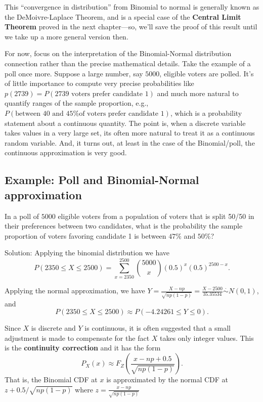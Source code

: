 \documentclass[
]{book}
\begin{document}
This ``convergence in distribution'' from Binomial to normal is generally known as the DeMoivre-Laplace Theorem, and is a special case of the \textbf{Central Limit Theorem} proved in the next chapter---so, we'll save the proof of this result until we take up a more general version then.

For now, focus on the interpretation of the Binomial-Normal distribution connection rather than the precise mathematical details. Take the example of a poll once more. Suppose a large number, say \(5000\), eligible voters are polled. It's of little importance to compute very precise probabilities like \(p(2739) = P(\text{2739 voters prefer candidate 1})\) and much more natural to quantify ranges of the sample proportion, e.g., \(P(\text{between 40 and 45\% of voters prefer candidate 1})\), which is a probability statement about a continuous quantity. The point is, when a discrete variable takes values in a very large set, its often more natural to treat it as a continuous random variable. And, it turns out, at least in the case of the Binomial/poll, the continuous approximation is very good.

\hypertarget{example-poll-and-binomial-normal-approximation}{%
\subsection{Example: Poll and Binomial-Normal approximation}\label{example-poll-and-binomial-normal-approximation}}

In a poll of \(5000\) eligible voters from a population of voters that is split 50/50 in their preferences between two candidates, what is the probability the sample proportion of voters favoring candidate 1 is between \(47\%\) and \(50\%\)?

Solution:
Applying the binomial distribution we have
\[P(2350\leq X \leq 2500) = \sum_{x=2350}^{2500} {5000 \choose x}(0.5)^x(0.5)^{2500-x}.\]

Applying the normal approximation, we have \(Y=\frac{X - np}{\sqrt{np(1-p)}} = \frac{X - 2500}{35.35534} \stackrel{\cdot}{\sim}N(0,1)\), and
\[P(2350\leq X \leq 2500)\approx P(-4.24261 \leq Y \leq 0).\]

Since \(X\) is discrete and \(Y\) is continuous, it is often suggested that a small adjustment is made to compensate for the fact \(X\) takes only integer values. This is the \textbf{continuity correction} and it has the form
\[P_X(x)\approx F_Z\left(\frac{x-np+0.5}{\sqrt{np(1-p)}}\right).\]
That is, the Binomial CDF at \(x\) is approximated by the normal CDF at \(z + 0.5/\sqrt{np(1-p)}\) where \(z = \frac{x-np}{\sqrt{np(1-p)}}\)
\end{document}
